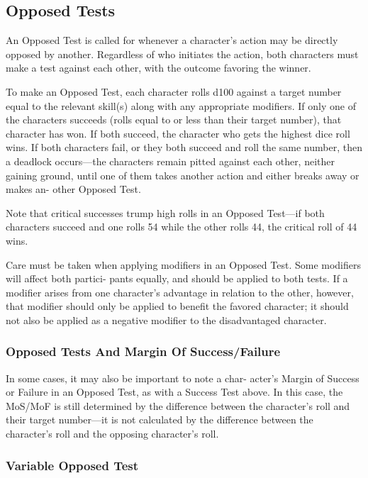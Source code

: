 \subsection{Opposed Tests}

An Opposed Test is called for whenever a character's 
action may be directly opposed by another. Regardless 
of who initiates the action, both characters must make 
a test against each other, with the outcome favoring 
the winner.

To make an Opposed Test, each character rolls 
d100 against a target number equal to the relevant 
skill(s) along with any appropriate modifiers. If only 
one of the characters succeeds (rolls equal to or less 
than their target number), that character has won. 
If both succeed, the character who gets the highest 
dice roll wins. If both characters fail, or they both 
succeed and roll the same number, then a deadlock 
occurs—the characters remain pitted against each 
other, neither gaining ground, until one of them takes 
another action and either breaks away or makes an-
other Opposed Test.

Note that critical successes trump high rolls in an 
Opposed Test—if both characters succeed and one rolls 
54 while the other rolls 44, the critical roll of 44 wins.

Care must be taken when applying modifiers in an 
Opposed Test. Some modifiers will affect both partici-
pants equally, and should be applied to both tests. If 
a modifier arises from one character's advantage in 
relation to the other, however, that modifier should 
only be applied to benefit the favored character; it 
should not also be applied as a negative modifier to 
the disadvantaged character.

\subsubsection{Opposed Tests And Margin Of Success/Failure}

In some cases, it may also be important to note a char-
acter's Margin of Success or Failure in an Opposed 
Test, as with a Success Test above. In this case, the 
MoS/MoF is still determined by the difference between 
the character's roll and their target number—it is not 
calculated by the difference between the character's 
roll and the opposing character's roll.

\subsubsection{Variable Opposed Test}

